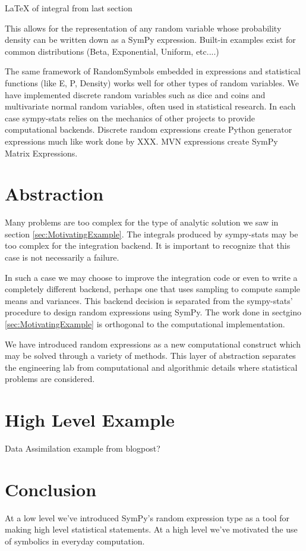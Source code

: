 \documentclass[11pt, a4paper, english]{article}
\begin{document}
LaTeX of integral from last section

This allows for the representation of any random variable whose probability density can be written down as a SymPy expression. Built-in examples exist for common distributions (Beta, Exponential, Uniform, etc....) 

The same framework of RandomSymbols embedded in expressions and statistical functions (like E, P, Density) works well for other types of random variables. We have implemented discrete random variables such as dice and coins and multivariate normal random variables, often used in statistical research. In each case sympy-stats relies on the mechanics of other projects to provide computational backends. Discrete random expressions create Python generator expressions much like work done by XXX. MVN expressions create SymPy Matrix
Expressions. 

\section{Abstraction}
Many problems are too complex for the type of analytic solution we saw in section \ref{sec:MotivatingExample}. The integrals produced by sympy-stats may be too complex for the integration backend. It is important to recognize that this case is not necessarily a failure.

In such a case we may choose to improve the integration code or even to write a completely different backend, perhaps one that uses sampling to compute sample means and variances. This backend decision is separated from the sympy-stats' procedure to design random expressions using SymPy. The work done in sectgino \ref{sec:MotivatingExample} is orthogonal to the computational implementation. 

We have introduced random expressions as a new computational construct which may be solved through a variety of methods. This layer of abstraction separates the engineering lab from computational and algorithmic details where statistical problems are considered.

\section{High Level Example}
Data Assimilation example from blogpost?

\section{Conclusion}
At a low level we've introduced SymPy's random expression type as a tool for making high level statistical statements. At a high level we've motivated the use of symbolics in everyday computation. 



\end{document}
